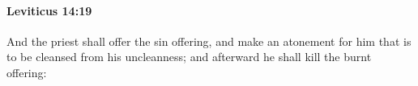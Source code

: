 
		\paragraph{Leviticus 14:19} %
			\label{LEVITICUS-14-19}

			And the priest shall offer the sin offering, and make an atonement for him that is to be cleansed from his uncleanness; and afterward he shall kill the burnt offering:


